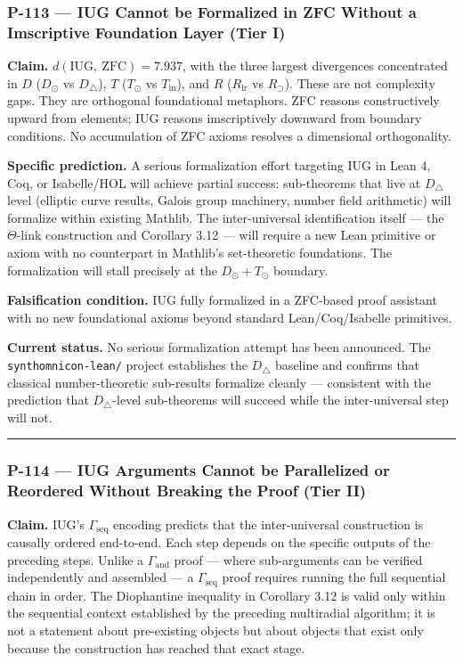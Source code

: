 \documentclass[10pt,a4paper]{article}
\begin{document}
\subsubsection{P-113 --- IUG Cannot be Formalized in ZFC Without a Imscriptive Foundation Layer (Tier I)}

\textbf{Claim.} $d(\text{IUG},\ \text{ZFC}) = 7.937$, with the three largest divergences
concentrated in $D$ ($D_\odot$ vs $D_{\triangle}$), $T$ ($T_\odot$ vs
$T_\text{in}$), and $R$ ($R_\text{lr}$ vs $R_{\supset}$). These are not complexity gaps.
They are orthogonal foundational metaphors. ZFC reasons constructively upward from elements;
IUG reasons imscriptively downward from boundary conditions. No accumulation of ZFC axioms
resolves a dimensional orthogonality.

\textbf{Specific prediction.} A serious formalization effort targeting IUG in Lean 4, Coq, or
Isabelle/HOL will achieve partial success: sub-theorems that live at $D_{\triangle}$ level
(elliptic curve results, Galois group machinery, number field arithmetic) will formalize
within existing Mathlib. The inter-universal identification itself --- the $\Theta$-link
construction and Corollary 3.12 --- will require a new Lean primitive or axiom with no
counterpart in Mathlib's set-theoretic foundations. The formalization will stall precisely
at the $D_\odot + T_\odot$ boundary.

\textbf{Falsification condition.} IUG fully formalized in a ZFC-based proof assistant with no
new foundational axioms beyond standard Lean/Coq/Isabelle primitives.

\textbf{Current status.} No serious formalization attempt has been announced. The
\texttt{synthomnicon-lean/} project establishes the $D_{\triangle}$ baseline and confirms that
classical number-theoretic sub-results formalize cleanly --- consistent with the prediction
that $D_{\triangle}$-level sub-theorems will succeed while the inter-universal step will not.

\begin{center}
\rule{0.5\textwidth}{0.4pt}
\end{center}

\subsubsection{P-114 --- IUG Arguments Cannot be Parallelized or Reordered Without Breaking the Proof (Tier II)}

\textbf{Claim.} IUG's $\Gamma_\text{seq}$ encoding predicts that the inter-universal construction
is causally ordered end-to-end. Each step depends on the specific outputs of the preceding
steps. Unlike a $\Gamma_\text{and}$ proof --- where sub-arguments can be verified
independently and assembled --- a $\Gamma_\text{seq}$ proof requires running the full
sequential chain in order. The Diophantine inequality in Corollary 3.12 is valid only
within the sequential context established by the preceding multiradial algorithm; it is not
a statement about pre-existing objects but about objects that exist only because the
construction has reached that exact stage.
\end{document}
